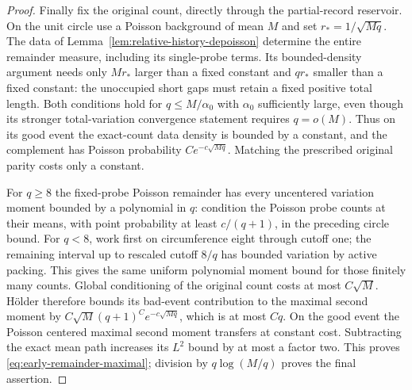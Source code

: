 \documentclass[11pt,letterpaper]{article}
\begin{document}
\begin{proof}
Finally fix the original count, directly through the partial-record
reservoir. On the unit circle use a Poisson background of mean $M$
and set $r_*=1/\sqrt{Mq}$.
The data of Lemma~\ref{lem:relative-history-depoisson} determine
the entire remainder measure, including its single-probe terms.
Its bounded-density argument needs only
$Mr_*$ larger than a fixed constant and
$qr_*$ smaller than a fixed constant: the unoccupied short
gaps must retain a fixed positive total length.
Both conditions hold for $q\le M/\alpha_0$ with $\alpha_0$
sufficiently large, even though its stronger total-variation
convergence statement requires $q=o(M)$.
Thus on its good event the exact-count data density is bounded
by a constant, and the complement has Poisson probability
$Ce^{-c\sqrt{Mq}}$. Matching the prescribed original parity
costs only a constant.

For $q\ge8$ the fixed-probe Poisson remainder has every
uncentered variation moment bounded by a polynomial in $q$:
condition the Poisson probe counts at their means, with point
probability at least $c/(q+1)$, in the preceding circle bound.
For $q<8$, work first on circumference eight through cutoff one;
the remaining interval up to rescaled cutoff $8/q$ has bounded
variation by active packing. This gives the same uniform
polynomial moment bound for those finitely many counts.
Global conditioning of the original count costs at most
$C\sqrt M$. H\"older therefore bounds its bad-event contribution
to the maximal second moment by
$C\sqrt M(q+1)^C e^{-c\sqrt{Mq}}$, which is at most $Cq$.
On the good event the Poisson centered maximal second moment
transfers at constant cost. Subtracting the exact mean path
increases its $L^2$ bound by at most a factor two.
This proves \eqref{eq:early-remainder-maximal}; division by
$q\log(M/q)$ proves the final assertion.
\end{proof}
\end{document}

